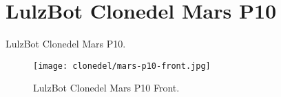 %
%
%
%
%

\section{LulzBot Clonedel Mars P10}
LulzBot Clonedel Mars P10.

\begin{figure}[h!]
\texttt{[image: clonedel/mars-p10-front.jpg]}
 \caption{LulzBot Clonedel Mars P10 Front.}
 \label{fig:clonedel-mars-p10-front}
\end{figure}


